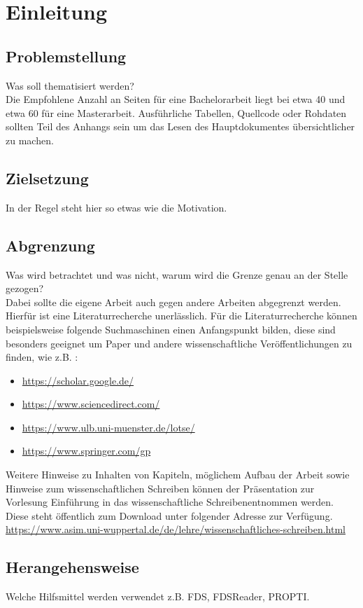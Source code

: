 \chapter{Einleitung}
\label{cpt:Einleitung}

\section{Problemstellung}
\label{sec:Problemstellung}

Was soll thematisiert werden?\\
Die Empfohlene Anzahl an Seiten für eine Bachelorarbeit liegt bei etwa 40 und etwa 60 für eine Masterarbeit. Ausführliche Tabellen, Quellcode oder Rohdaten sollten Teil des Anhangs sein um das Lesen des Hauptdokumentes übersichtlicher zu machen. 

\section{Zielsetzung}
\label{sec:Zielsetzung}

In der Regel steht hier so etwas wie die Motivation.

\section{Abgrenzung}
\label{sec:Abgrenzung}

Was wird betrachtet und was nicht, warum wird die Grenze genau an der Stelle gezogen?\\
Dabei sollte die eigene Arbeit auch gegen andere Arbeiten abgegrenzt werden. Hierfür ist eine Literaturrecherche unerlässlich. Für die Literaturrecherche können beispielsweise folgende Suchmaschinen einen Anfangspunkt bilden, diese sind besonders geeignet um Paper und andere wissenschaftliche Veröffentlichungen zu finden, wie z.B. \cite{Hehnen.2020}:
\begin{itemize}[itemsep=-6pt]
	\item \url{https://scholar.google.de/}
	\item \url{https://www.sciencedirect.com/}
	\item \url{https://www.ulb.uni-muenster.de/lotse/}
	\item \url{https://www.springer.com/gp}
\end{itemize}

Weitere Hinweise zu Inhalten von Kapiteln, möglichem Aufbau der Arbeit sowie Hinweise zum wissenschaftlichen Schreiben können der Präsentation zur Vorlesung \glqq Einführung in das wissenschaftliche Schreiben\grqq entnommen werden. Diese steht öffentlich zum Download unter folgender Adresse zur Verfügung.
\url{https://www.asim.uni-wuppertal.de/de/lehre/wissenschaftliches-schreiben.html}

\section{Herangehensweise}
\label{sec:Herangehensweise}

Welche Hilfsmittel werden verwendet z.B. \ac{FDS}, FDSReader, PROPTI.